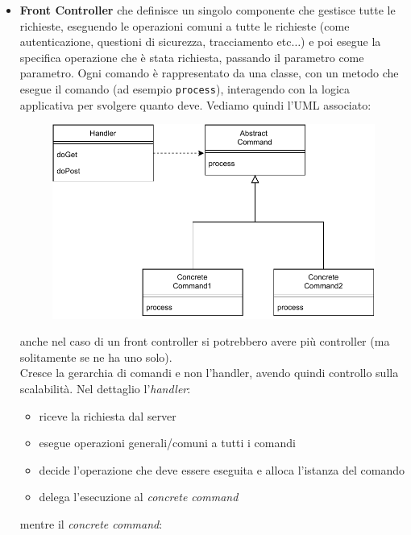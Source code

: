 \documentclass[a4paper,12pt, oneside]{book}
\begin{document}
\begin{itemize}
\begin{figure}[H]
{      implementati come servlet. Si nota anche il collegamento diretto tra la
      view e il model}
    \label{fig:pc}
  \end{figure}
  \item \textbf{Front Controller} che definisce un singolo componente che
  gestisce tutte le richieste, eseguendo le operazioni comuni a tutte le
  richieste (come autenticazione, questioni di sicurezza, tracciamento
  etc$\ldots$) e poi esegue la specifica operazione che è stata richiesta,
  passando il parametro
  come parametro. Ogni comando è rappresentato da una classe, con un metodo che
  esegue il comando (ad esempio \texttt{process}), interagendo con la logica
  applicativa per svolgere quanto deve.
  Vediamo quindi l'UML associato:
  \begin{figure}[H]
    \centering
    \includegraphics[scale = 0.7]{img/mvc2.pdf}
  \end{figure}
  anche nel caso di un front controller si potrebbero avere più controller (ma
  solitamente se ne ha uno solo).\\
  Cresce la gerarchia di comandi e non l'handler, avendo quindi controllo sulla
  scalabilità. 
  Nel dettaglio l'\textit{handler}:
  \begin{itemize}
    \item riceve la richiesta dal server 
    \item esegue operazioni generali/comuni a tutti i comandi
    \item decide l'operazione che deve essere eseguita e alloca l'istanza del
    comando 
    \item delega l'esecuzione al \textit{concrete command}
  \end{itemize}
  mentre il \textit{concrete command}:
  \begin{itemize}

\end{itemize}
\end{itemize}
\end{document}
